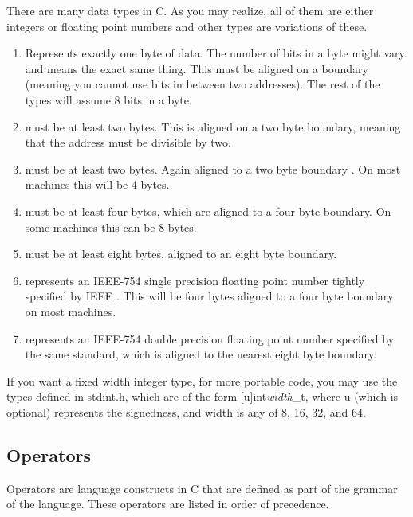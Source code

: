 There are many data types in C.
As you may realize, all of them are either integers or floating point numbers and other types are variations of these.

\begin{enumerate}
\item {} Represents exactly one byte of data.
  The number of bits in a byte might vary.
   and  means the exact same thing.
  This must be aligned on a boundary (meaning you cannot use bits in between two addresses).
  The rest of the types will assume 8 bits in a byte.
\item {} must be at least two bytes.
  This is aligned on a two byte boundary, meaning that the address must be divisible by two.
\item {} must be at least two bytes.
  Again aligned to a two byte boundary \cite[P.
    34]{ISON1124}. On most machines this will be 4 bytes.
\item {} must be at least four bytes, which are aligned to a four byte boundary.
  On some machines this can be 8 bytes.
	\item {} must be at least eight bytes, aligned to an eight byte boundary.
	\item {} represents an IEEE-754 single precision floating point number tightly specified by IEEE \cite{4610935}.
    This will be four bytes aligned to a four byte boundary on most machines.
	\item {} represents an IEEE-754 double precision floating point number specified by the same standard, which is aligned to the nearest eight byte boundary.
\end{enumerate}

If you want a fixed width integer type, for more portable code, you may use the types defined in stdint.h, which are of the form [u]int\emph{width}\_t, where u (which is optional) represents the signedness, and width is any of 8, 16, 32, and 64.

\subsection{Operators}

Operators are language constructs in C that are defined as part of the grammar of the language.
These operators are listed in order of precedence.

